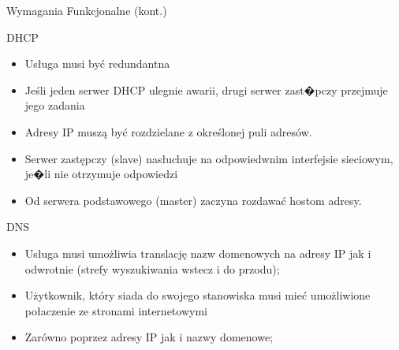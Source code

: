 \documentclass[presentation]{beamer}
\begin{document}
\begin{frame}[label={sec:org597d94f}]{Wymagania Funkcjonalne (kont.)}
\begin{block}{DHCP}
\begin{itemize}
\item Usługa musi być redundantna
\item Jeśli jeden serwer DHCP ulegnie awarii, drugi serwer zast�pczy przejmuje jego zadania
\item Adresy IP muszą być rozdzielane z określonej puli adresów.
\item Serwer zastępczy (slave) nasłuchuje na odpowiedwnim interfejsie sieciowym, je�li nie otrzymuje odpowiedzi
\item Od serwera podstawowego (master) zaczyna rozdawać hostom adresy.
\end{itemize}
\end{block}
\begin{block}{DNS}
\begin{itemize}
\item Usługa musi umożliwia translację nazw domenowych na adresy IP jak i odwrotnie (strefy wyszukiwania wstecz i do przodu);
\item Użytkownik, który siada do swojego stanowiska musi mieć umożliwione połaczenie ze stronami internetowymi
\item Zarówno poprzez adresy IP jak i nazwy domenowe;
\end{itemize}
\end{block}
\end{frame}
\end{document}
